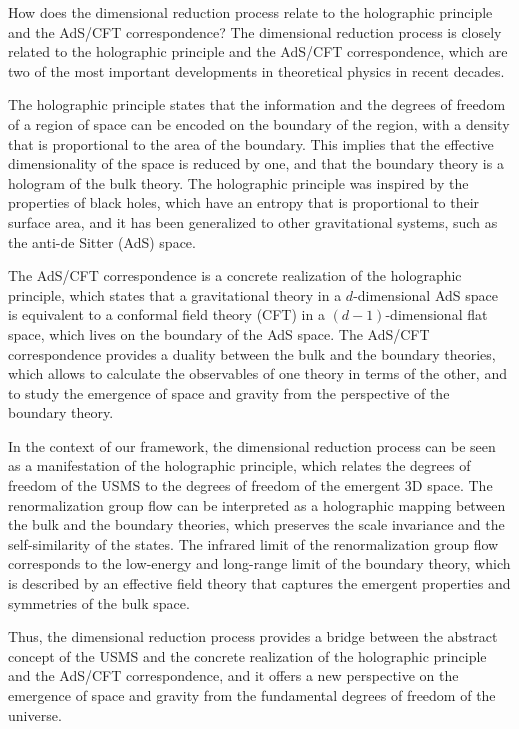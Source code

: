 \begin{tcolorbox}[colback=green!5!white,colframe=green!75!black,title=Question]
    How does the dimensional reduction process relate to the holographic principle and the AdS/CFT correspondence?
    \tcblower
    The dimensional reduction process is closely related to the holographic principle and the AdS/CFT correspondence, which are two of the most important developments in theoretical physics in recent decades.

    The holographic principle states that the information and the degrees of freedom of a region of space can be encoded on the boundary of the region, with a density that is proportional to the area of the boundary. This implies that the effective dimensionality of the space is reduced by one, and that the boundary theory is a hologram of the bulk theory. The holographic principle was inspired by the properties of black holes, which have an entropy that is proportional to their surface area, and it has been generalized to other gravitational systems, such as the anti-de Sitter (AdS) space.

    The AdS/CFT correspondence is a concrete realization of the holographic principle, which states that a gravitational theory in a $d$-dimensional AdS space is equivalent to a conformal field theory (CFT) in a $(d-1)$-dimensional flat space, which lives on the boundary of the AdS space. The AdS/CFT correspondence provides a duality between the bulk and the boundary theories, which allows to calculate the observables of one theory in terms of the other, and to study the emergence of space and gravity from the perspective of the boundary theory.

    In the context of our framework, the dimensional reduction process can be seen as a manifestation of the holographic principle, which relates the degrees of freedom of the USMS to the degrees of freedom of the emergent 3D space. The renormalization group flow can be interpreted as a holographic mapping between the bulk and the boundary theories, which preserves the scale invariance and the self-similarity of the states. The infrared limit of the renormalization group flow corresponds to the low-energy and long-range limit of the boundary theory, which is described by an effective field theory that captures the emergent properties and symmetries of the bulk space.

    Thus, the dimensional reduction process provides a bridge between the abstract concept of the USMS and the concrete realization of the holographic principle and the AdS/CFT correspondence, and it offers a new perspective on the emergence of space and gravity from the fundamental degrees of freedom of the universe.
\end{tcolorbox}

